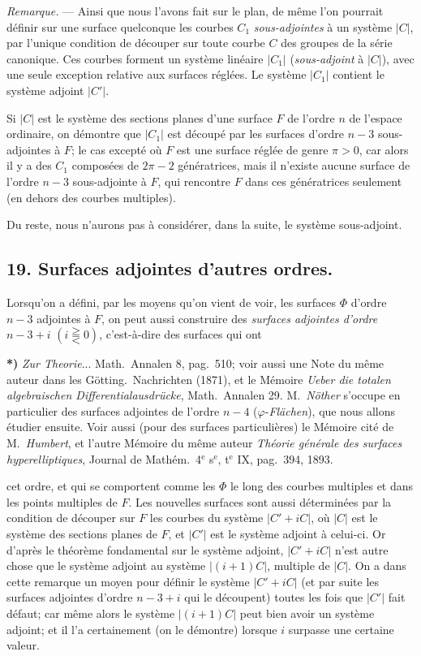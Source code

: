\documentclass{article}
\begin{document}
\emph{Remarque.} --- Ainsi que nous l'avons fait sur le plan, de même l'on pourrait définir sur une surface quelconque les courbes $C_{1}$ \emph{sous-adjointes} à un système $|C|$, par l'unique condition de découper sur toute courbe $C$ des groupes de la série canonique. Ces courbes forment un système linéaire $|C_{1}|$ (\emph{sous-adjoint} à $|C|$), avec une seule exception relative aux surfaces réglées. Le système $|C_{1}|$ contient le système adjoint $|C'|$.

Si $|C|$ est le système des sections planes d'une surface $F$ de l'ordre $n$ de l'espace ordinaire, on démontre que $|C_{1}|$ est découpé par les surfaces d'ordre $n-3$ sous-adjointes à $F$; le cas excepté où $F$ est une surface réglée de genre $\pi > 0$, car alors il y a des $C_{1}$ composées de $2\pi-2$ génératrices, mais il n'existe aucune surface de l'ordre $n-3$ sous-adjointe à $F$, qui rencontre $F$ dans ces génératrices seulement (en dehors des courbes multiples).

Du reste, nous n'aurons pas à considérer, dans la suite, le système sous-adjoint.

\subsection*{19. Surfaces adjointes d'autres ordres.}

Lorsqu'on a défini, par les moyens qu'on vient de voir, les surfaces $\Phi$ d'ordre $n-3$ adjointes à $F$, on peut aussi construire des \emph{surfaces adjointes d'ordre} $n-3+i$ $(i \gtreqqless 0)$, c'est-à-dire des surfaces qui ont

\textbf{*)} \emph{Zur Theorie}... Math.\ Annalen 8, pag.\ 510; voir aussi une Note du même auteur dans les Götting.\ Nachrichten (1871), et le Mémoire \emph{Ueber die totalen algebraischen Differentialausdrücke}, Math.\ Annalen 29. M.\ \emph{Nöther} s'occupe en particulier des surfaces adjointes de l'ordre $n-4$ ($\varphi$-\emph{Flächen}), que nous allons étudier ensuite. Voir aussi (pour des surfaces particulières) le Mémoire cité de M.\ \emph{Humbert}, et l'autre Mémoire du même auteur \emph{Théorie générale des surfaces hyperelliptiques}, Journal de Mathém.\ 4${}^{\text{e}}$ s${}^{\text{e}}$, t${}^{\text{e}}$ IX, pag.\ 394, 1893.

cet ordre, et qui se comportent comme les $\Phi$ le long des courbes multiples et dans les points multiples de $F$. Les nouvelles surfaces sont aussi déterminées par la condition de découper sur $F$ les courbes du système $|C'+iC|$, où $|C|$ est le système des sections planes de $F$, et $|C'|$ est le système adjoint à celui-ci. Or d'après le théorème fondamental sur le système adjoint, $|C'+iC|$ n'est autre chose que le système adjoint au système $|(i+1)C|$, multiple de $|C|$. On a dans cette remarque un moyen pour définir le système $|C'+iC|$ (et par suite les surfaces adjointes d'ordre $n-3+i$ qui le découpent) toutes les fois que $|C'|$ fait défaut; car même alors le système $|(i+1)C|$ peut bien avoir un système adjoint; et il l'a certainement (on le démontre) lorsque $i$ surpasse une certaine valeur.
\end{document}
